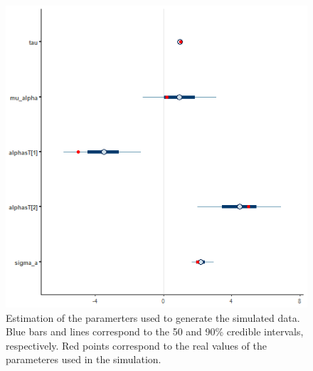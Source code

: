 \documentclass[
]{article}
\begin{document}
\begin{figure}

\includegraphics[width=6.67in,]{images/simple_mcmc_intervals} \hfill{}

\caption{ Estimation of the paramerters used to generate the simulated data. Blue bars and lines correspond to the 50 and 90\% credible intervals, respectively. Red points correspond to the real values of the parameteres used in the simulation.}\label{fig:est_simple}
\end{figure}
\end{document}
